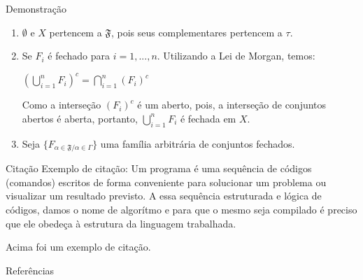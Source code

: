 \documentclass[aspectratio=169]{beamer}
\newenvironment{citacao}%
  {\endgraf\justify
\quote}%
  {\newline\endquote}
\begin{document}
\begin{frame}{Demonstração}
 \begin{prova}
   \begin{enumerate}[i]
\item $\emptyset$ e $X$ pertencem a $\mathfrak{F}$, pois seus
   complementares pertencem a $\tau$.
   \item Se $F_{i}$ é fechado para $i = 1,...,n$. Utilizando a Lei de Morgan, temos:
   \begin{center}
   $(\bigcup\limits_{i=1}^{n} F_{i})^{c} = \bigcap\limits_{i=1}^{n} (F_{i})^{c}$
   \end{center}
   Como a interseção $(F_{i})^{c}$ é  um aberto, pois, a interseção
   de conjuntos abertos é aberta, portanto, $\bigcup\limits_{i=1}^{n} F_{i}$ é fechada
   em $X.$
   \item Seja $\{F_{\alpha \in \mathfrak{F} / \alpha \in
   \Gamma}\}$ uma família arbitrária de conjuntos fechados.
   \end{enumerate}
 \end{prova}    
\end{frame}





\begin{frame}{Citação}
Exemplo de citação:
\begin{citacao}
Um programa é uma sequência de códigos (comandos) escritos de forma conveniente para solucionar um problema ou visualizar um resultado previsto. A essa sequência estruturada e lógica de códigos, damos o nome de algorítmo e para que o mesmo seja compilado é preciso que ele obedeça à estrutura da linguagem trabalhada.
\end{citacao}

Acima foi um exemplo de citação.
\end{frame}


\begin{frame}{Referências}

\end{frame}



\end{document}
